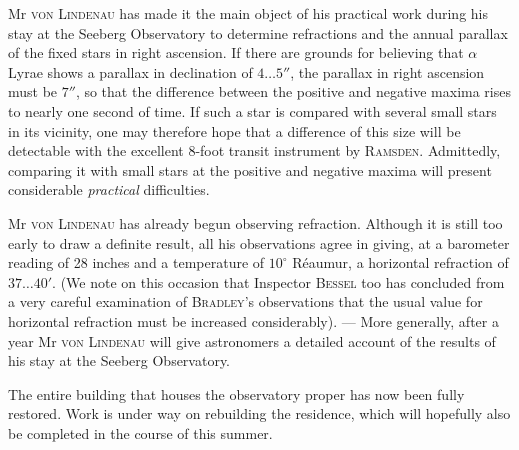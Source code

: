 Mr \textsc{von Lindenau} has made it the main object of his practical work during his stay at the Seeberg Observatory to determine refractions and the annual parallax of the fixed stars in right ascension. If there are grounds for believing that $\alpha$ Lyrae shows a parallax in declination of $4\ldots5''$, the parallax in right ascension must be $7''$, so that the difference between the positive and negative maxima rises to nearly one second of time. If such a star is compared with several small stars in its vicinity, one may therefore hope that a difference of this size will be detectable with the excellent 8-foot transit instrument by \textsc{Ramsden}. Admittedly, comparing it with small stars at the positive and negative maxima will present considerable \emph{practical} difficulties.

Mr \textsc{von Lindenau} has already begun observing refraction. Although it is still too early to draw a definite result, all his observations agree in giving, at a barometer reading of 28 inches and a temperature of $10^{\circ}$ Réaumur, a horizontal refraction of $37\ldots40'$. (We note on this occasion that Inspector \textsc{Bessel} too has concluded from a very careful examination of \textsc{Bradley}’s observations that the usual value for horizontal refraction must be increased considerably). — More generally, after a year Mr \textsc{von Lindenau} will give astronomers a detailed account of the results of his stay at the Seeberg Observatory.

The entire building that houses the observatory proper has now been fully restored. Work is under way on rebuilding the residence, which will hopefully also be completed in the course of this summer.
